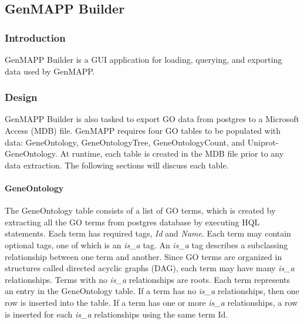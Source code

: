 \subsection{GenMAPP Builder}
\label{gmbuilder}

\subsubsection{Introduction}
GenMAPP Builder is a GUI application for loading, querying, and exporting data
used by GenMAPP.

\subsubsection{Design}

GenMAPP Builder is also tasked to export GO data from postgres to a Microsoft Access (MDB) file.
GenMAPP requires four GO tables to be populated with data: GeneOntology,
GeneOntologyTree, GeneOntologyCount, and Uniprot-GeneOntology. At runtime, each table
is created in the MDB file prior to any data extraction.
The following sections will discuss each table.

\paragraph{GeneOntology}
\label{gotable}
The GeneOntology table consists of a list of GO terms, which is created by extracting all the
GO terms from postgres database by executing HQL statements. Each term has required tags, \emph{Id} and \emph{Name}.
Each term may contain optional tags, one of which is an \emph{is\_a} tag. An \emph{is\_a} tag describes a
subclassing relationship between one term and another. Since GO terms
are organized in structures called directed acyclic graphs (DAG), each term may have many \emph{is\_a} relationships.
Terms with no \emph{is\_a} relationships are roots. Each term represents an entry in the GeneOntology table. If a term
has no \emph{is\_a} relationships, then one row is inserted into the table. If a term has one or more
\emph{is\_a} relationships, a row is inserted for each \emph{is\_a} relationships using the same term Id.



